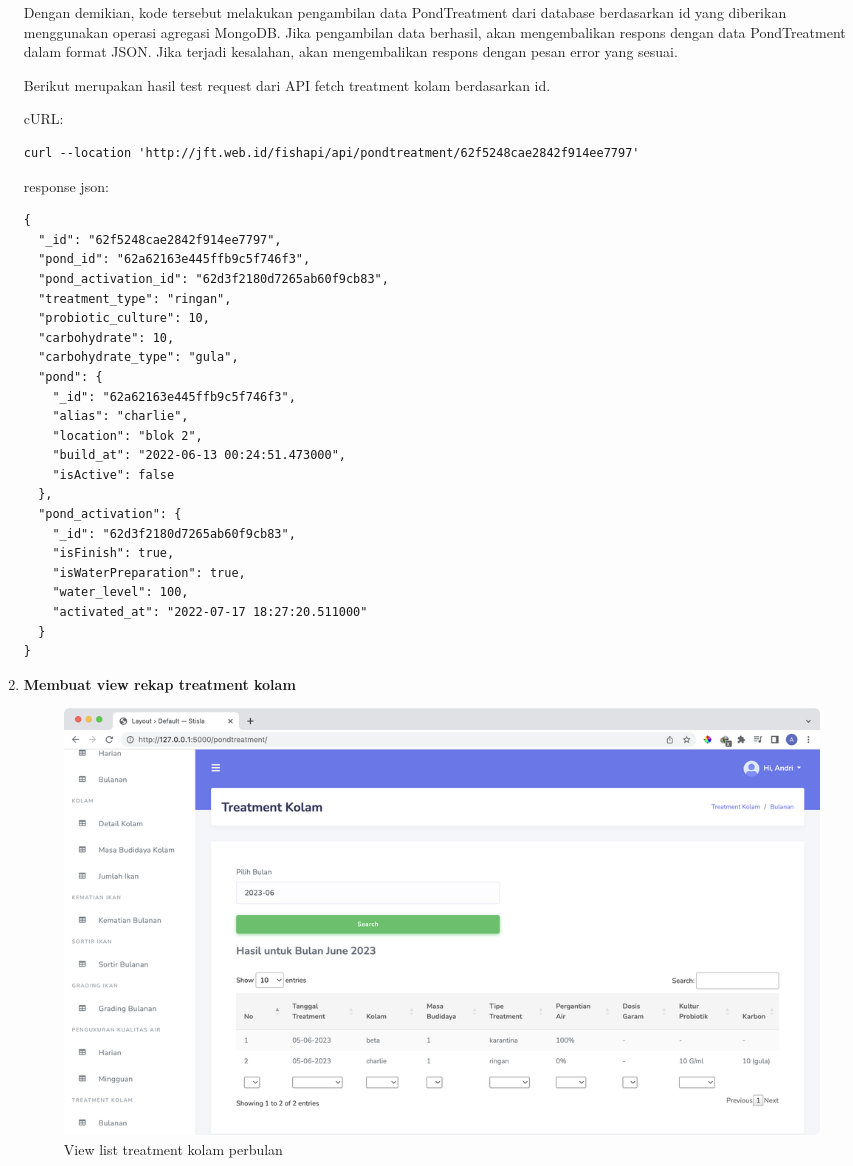 \begin{enumerate}[1.]
Dengan demikian, kode tersebut melakukan pengambilan data PondTreatment dari database berdasarkan id yang diberikan menggunakan operasi agregasi MongoDB. Jika pengambilan data berhasil, akan mengembalikan respons dengan data PondTreatment dalam format JSON. Jika terjadi kesalahan, akan mengembalikan respons dengan pesan error yang sesuai.


Berikut merupakan hasil test request dari API fetch treatment kolam berdasarkan id.

cURL:

\begin{lstlisting}
curl --location 'http://jft.web.id/fishapi/api/pondtreatment/62f5248cae2842f914ee7797'
\end{lstlisting}

response json:

\begin{lstlisting}
{
  "_id": "62f5248cae2842f914ee7797",
  "pond_id": "62a62163e445ffb9c5f746f3",
  "pond_activation_id": "62d3f2180d7265ab60f9cb83",
  "treatment_type": "ringan",
  "probiotic_culture": 10,
  "carbohydrate": 10,
  "carbohydrate_type": "gula",
  "pond": {
    "_id": "62a62163e445ffb9c5f746f3",
    "alias": "charlie",
    "location": "blok 2",
    "build_at": "2022-06-13 00:24:51.473000",
    "isActive": false
  },
  "pond_activation": {
    "_id": "62d3f2180d7265ab60f9cb83",
    "isFinish": true,
    "isWaterPreparation": true,
    "water_level": 100,
    "activated_at": "2022-07-17 18:27:20.511000"
  }
}
\end{lstlisting}

\item \textbf{Membuat view rekap treatment kolam}
\begin{figure}[H]
	\centering
	\includegraphics[width=1\textwidth]{gambar/Sprint10/view/view_rekap_treatment_kolam}
	\caption{View list treatment kolam perbulan}
	\label{fig:view_list_treatment_kolam_perbulan}
\end{figure}




\end{enumerate}